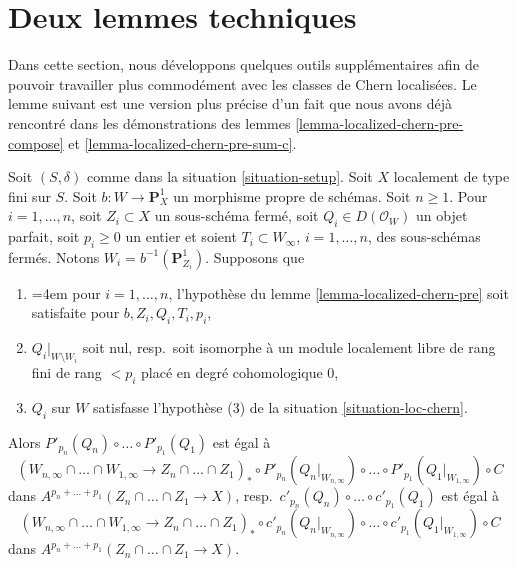 \section{Deux lemmes techniques}
\label{section-tools-loc-chern}

\noindent
Dans cette section, nous développons quelques outils supplémentaires afin de pouvoir travailler
plus commodément avec les classes de Chern localisées. Le lemme suivant
est une version plus précise d'un fait que nous avons déjà rencontré dans
les démonstrations des lemmes \ref{lemma-localized-chern-pre-compose} et
\ref{lemma-localized-chern-pre-sum-c}.

\begin{lemma}
\label{lemma-homomorphism-final}
Soit $(S, \delta)$ comme dans la situation \ref{situation-setup}. Soit $X$
localement de type fini sur $S$. Soit $b : W \longrightarrow \mathbf{P}^1_X$
un morphisme propre de schémas. Soit $n \geq 1$. Pour $i = 1, \ldots, n$,
soit $Z_i \subset X$ un sous-schéma fermé, soit $Q_i \in D(\mathcal{O}_W)$
un objet parfait, soit $p_i \geq 0$ un entier et soient
$T_i \subset W_\infty$, $i = 1, \ldots, n$, des sous-schémas fermés.
Notons $W_i = b^{-1}(\mathbf{P}^1_{Z_i})$. Supposons que
\begin{enumerate}
\item {\emergencystretch=4em pour $i = 1, \ldots, n$, l'hypothèse du
lemme \ref{lemma-localized-chern-pre} soit satisfaite pour
$b, Z_i, Q_i, T_i, p_i$,\par}
\item $Q_i|_{W \setminus W_i}$ soit nul, resp.\ soit isomorphe à un module
localement libre de rang fini de rang $< p_i$ placé en degré cohomologique $0$,
\item $Q_i$ sur $W$ satisfasse
l'hypothèse (3) de la situation \ref{situation-loc-chern}.
\end{enumerate}
Alors $P'_{p_n}(Q_n) \circ \ldots \circ P'_{p_1}(Q_1)$ est égal à
$$
(W_{n, \infty} \cap \ldots \cap W_{1, \infty} \to
Z_n \cap \ldots \cap Z_1)_* \circ
P'_{p_n}(Q_n|_{W_{n, \infty}}) \circ \ldots \circ P'_{p_1}(Q_1|_{W_{1, \infty}})
\circ C
$$
dans $A^{p_n + \ldots + p_1}(Z_n \cap \ldots \cap Z_1 \to X)$,
resp.\ $c'_{p_n}(Q_n) \circ \ldots \circ c'_{p_1}(Q_1)$ est égal à
$$
(W_{n, \infty} \cap \ldots \cap W_{1, \infty} \to
Z_n \cap \ldots \cap Z_1)_* \circ
c'_{p_n}(Q_n|_{W_{n, \infty}}) \circ \ldots \circ c'_{p_1}(Q_1|_{W_{1, \infty}})
\circ C
$$
dans $A^{p_n + \ldots + p_1}(Z_n \cap \ldots \cap Z_1 \to X)$.
\end{lemma}

